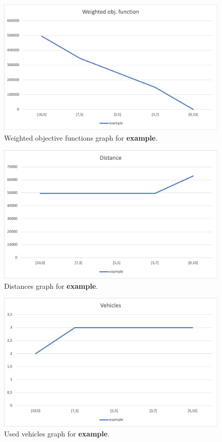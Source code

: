 \begin{figure}[H]
    \centering
    \includegraphics[height=0.25\textheight]{../graphs/example-wobjf.png}
    \caption{Weighted objective functions graph for \textbf{example}.}
\end{figure}

\begin{figure}[H]
    \centering
    \includegraphics[height=0.25\textheight]{../graphs/example-distance.png}
    \caption{Distances graph for \textbf{example}.}
\end{figure}

\begin{figure}[H]
    \centering
    \includegraphics[height=0.25\textheight]{../graphs/example-vehicles.png}
    \caption{Used vehicles graph for \textbf{example}.}
\end{figure}

\newpage